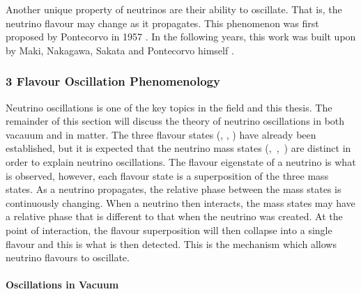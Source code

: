 Another unique property of neutrinos are their ability to oscillate. That is, the neutrino flavour may change as it propagates. This phenomenon was first proposed by Pontecorvo in 1957 \cite{Pontecorvo}. In the following years, this work was built upon by Maki, Nakagawa, Sakata and Pontecorvo himself \cite{MNS_oscillations}. 

\subsubsection{3 Flavour Oscillation Phenomenology}

Neutrino oscillations is one of the key topics in the field and this thesis. The remainder of this section will discuss the theory of neutrino oscillations in both vacauum and in matter. The three flavour states (\nue, \numu, \nutau) have already been established,
but it is expected that the neutrino mass states \mbox{(\nuone, \nutwo, \nuthree)} are distinct in order to explain neutrino oscillations. The flavour eigenstate of a neutrino is what is observed, however, each flavour state is a superposition of the three mass states. As a neutrino propagates, the relative phase between the mass states is continuously changing. When a neutrino then interacts, the mass states may have a relative phase that is different to that when the neutrino was created. At the point of interaction, the flavour superposition will then collapse into a single flavour and this is what is then detected. This is the mechanism which allows neutrino flavours to oscillate. 

\paragraph{Oscillations in Vacuum}



